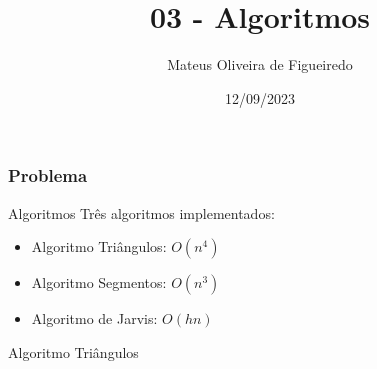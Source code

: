 \documentclass[aspectratio=169,usenames,dvipsnames]{beamer}
\title{03 - Algoritmos}
\author{Mateus Oliveira de Figueiredo}
\date{12/09/2023}
\begin{document}
\begin{frame}
\titlepage
\end{frame}

\begin{frame}
\frametitle{Problema}

\begin{figure}
\begin{overprint}
\end{overprint}
\end{figure}

\end{frame}

\begin{frame}{Algoritmos}
      Três algoritmos implementados:
      \begin{itemize}
        \item Algoritmo Triângulos: $O(n^4)$
        \item Algoritmo Segmentos: $O(n^3)$
        \item Algoritmo de Jarvis: $O(hn)$
      \end{itemize}
\end{frame}

\begin{frame}{Algoritmo Triângulos}

  \begin{center}
    \begin{figure}
      \begin{overprint}
      \end{overprint}
    \end{figure}
  \end{center}

  \begin{overprint}
  \end{overprint}
\end{frame}
\end{document}
